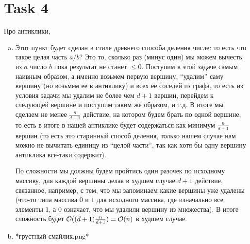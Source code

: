 \section{Task 4}
\begin{task}
    Про антиклики,
\end{task}

\begin{solution}
    \begin{enumerate}[a)]
        \item Этот пункт будет сделан в стиле древнего способа деления числе: то есть что такое целая часть $a/b$? Это то, сколько раз (минус один) мы можем вычесть из $a$ число $b$ пока результат не станет $\leq 0$.
        Поступим в этой задаче самым наивным образом, а именно возьмем первую вершину, ``удалим'' саму вершину (но возьмем ее в антиклику) и всех ее соседей из графа, то есть из условия задачи мы удалим не более чем $d+1$ вершин, перейдем к следующей вершине и поступим таким же образом, и т.д. В итоге мы сделаем не менее $\frac{n}{d+1}$ действие, на котором будем брать по одной вершине, то есть в итоге в нашей антиклике будет содержаться как минимум $\frac{n}{d+1}$ вершин (то есть это старинный способ деления, только нашем случае нам можно не вычитать единицу из ``целой части'', так как хотя бы одну вершину антиклика все-таки содержит).
        
        По сложности мы должны будем пройтись один разочек по исходному массиву, для каждой вершины делая в худшем случае $d+1$ действие, связанное, например, с тем, что мы запоминаем какие вершины уже удалены (что-то типа массива $0$ и $1$ для исходного массива, где изначально все элементы $1$, а $0$ означает, что мы удалили вершину из множества). В итоге сложность будет $\mathcal{O}((d+1)\frac{n}{d+1}) = \mathcal{O}(n)$ в худшем случае.
        \item *грустный смайлик.png*
    \end{enumerate}
\end{solution}